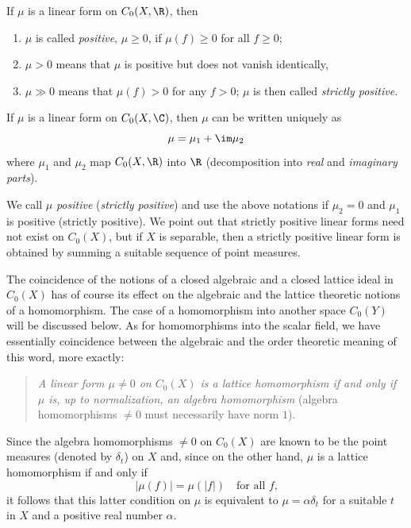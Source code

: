 If\/ $\mu$ is a linear form on $C_{0}(X,\R)$, then
\begin{enumerate}[\upshape (i), labelindent=.25em]

\item
$ \mu $ is called \emph{positive}, $\mu \geq 0$, if $ \mu(f) \geq 0 $ for all $ f \geq 0 $;  
\item
$ \mu > 0 $ means that $ \mu $ is positive but does not vanish identically,

\item
$ \mu \gg 0 $ means that $ \mu(f) > 0 $ for any $ f > 0 $;  $ \mu $ is then called \emph{strictly positive}.

\end{enumerate}
If\/ $\mu$ is a linear form on $C_{0}(X,\C)$, then $\mu$ can be written uniquely as 
%
\[
	\mu = \mu_{1} + \im \mu_{2}
\]
%
where $\mu_{1}$ and $\mu_{2}$ map $C_{0}(X,\R)$ into $\R$ (decomposition into \emph{real} and \emph{imaginary parts}).

We call $\mu$ \emph{positive} (\emph{strictly positive}) and use the above notations if\/ $\mu_{2} = 0$ and $\mu_{1}$ is positive (strictly positive).
We point out that strictly positive linear forms need not exist on $C_{0}(X)$, but if\/ $X$ is separable, then a strictly positive linear form is obtained by summing a suitable sequence of point measures.

The coincidence of the notions of a closed algebraic and a closed lattice ideal in $C_{0}(X)$ has of course its effect on the algebraic and the lattice theoretic notions of a homomorphism.
The case of a homomorphism into another space $C_{0}(Y)$ will be discussed below.
As for homomorphisms into the scalar field, we have essentially coincidence between the algebraic and the order theoretic meaning of this word, more exactly: 
\begin{quote}
\emph{A linear form $\mu \neq 0$ on $C_{0}(X)$ is a lattice homomorphism if and only if\/ $\mu$ is, up to normalization, an algebra homomorphism }(algebra homomorphisms $\neq 0$ must necessarily have norm $1$).
\end{quote}
Since the algebra homomorphisms $\neq 0$ on $C_{0}(X)$ are known to be the point measures (denoted by $\delta_{t}$) on $X$ and, since on the other hand, $\mu$ is a lattice homomorphism if and only if 
%
\[
	|\mu(f)| =  \mu(|f|) \quad \text{for all $f$,}
\]
%
it follows that this latter condition on $\mu$ is equivalent to $\mu = \alpha\delta_{t}$ for a suitable $t$ in $X$ and a positive real number $\alpha$.

